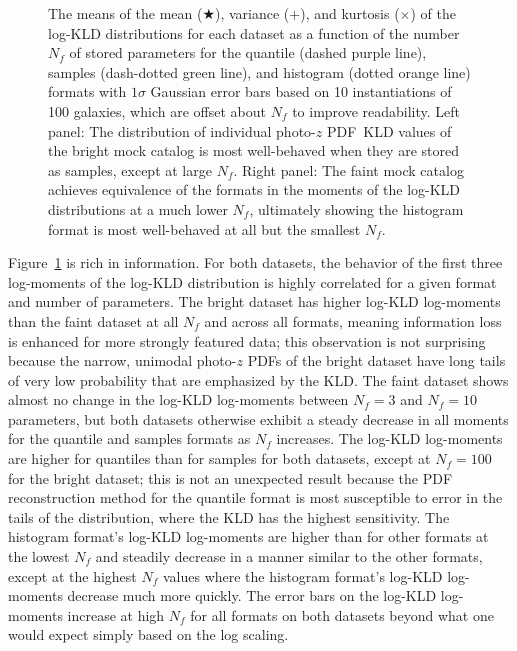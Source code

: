 \documentclass[\docopts]{\docclass}
\newcommand{\pz}{photo-$z$ PDF}
\newcommand{\mgdata}{bright\xspace}
\newcommand{\ssdata}{faint\xspace}
\begin{document}
\begin{figure}
\begin{center}
    \caption{
    The means of the mean ($\bigstar$), variance ($+$), and kurtosis ($\times$) 
of the log-KLD distributions for each dataset as a function of the number 
$N_{f}$ of stored parameters for the quantile (dashed purple line), samples 
(dash-dotted green line), and histogram (dotted orange line) formats with 
$1\sigma$ Gaussian error bars based on 10 instantiations of 100 galaxies, which 
are offset about $N_{f}$ to improve readability.
    Left panel: The distribution of individual \pz\ KLD values of the \mgdata 
mock catalog is most well-behaved when they are stored as samples, except at 
large $N_{f}$.
    Right panel: The \ssdata mock catalog achieves equivalence of the formats 
in the moments of the log-KLD distributions at a much lower $N_{f}$, ultimately 
showing the histogram format is most well-behaved at all but the smallest 
$N_{f}$.
    \label{fig:kld_moments}}
  \end{center}
\end{figure}

Figure~\ref{fig:kld_moments} is rich in information.
For both datasets, the behavior of the first three log-moments of the log-KLD 
distribution is highly correlated for a given format and number of parameters.
The \mgdata dataset has higher log-KLD log-moments than the \ssdata dataset at 
all $N_{f}$ and across all formats, meaning information loss is enhanced for 
more strongly featured data; this observation is not surprising because the 
narrow, unimodal \pz s of the \mgdata dataset have long tails of very low 
probability that are emphasized by the KLD.
The \ssdata dataset shows almost no change in the log-KLD log-moments between 
$N_{f}=3$ and $N_{f}=10$ parameters, but both datasets otherwise exhibit a 
steady decrease in all moments for the quantile and samples formats as $N_{f}$ 
increases.
The log-KLD log-moments are higher for quantiles than for samples for both 
datasets, except at $N_{f}=100$ for the \mgdata dataset; this is not an 
unexpected result because the PDF reconstruction method for the quantile format 
is most susceptible to error in the tails of the distribution, where the KLD 
has the highest sensitivity.
The histogram format's log-KLD log-moments are higher than for other formats at 
the lowest $N_{f}$ and steadily decrease in a manner similar to the other 
formats, except at the highest $N_{f}$ values where the histogram format's 
log-KLD log-moments decrease much more quickly.
The error bars on the log-KLD log-moments increase at high $N_{f}$ for all 
formats on both datasets beyond what one would expect simply based on the log 
scaling.
\end{document}
